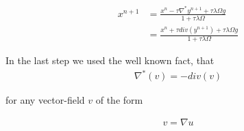 \begin{align}
	x^{n+1} 
	&= \frac{x^n - \tau \nabla^* y^{n+1} +  \tau \lambda \Omega g}{1+\tau \lambda \Omega} \nonumber \\
	&= \frac{x^n + \tau div(y^{n+1}) +  \tau \lambda \Omega g}{1+\tau \lambda \Omega}
\label{eq:update_x_n_p_1}	
\end{align}

In the last step we used the well known fact, that 
\begin{align}
	\nabla^* (v) = -div(v)
\end{align}

for any vector-field $v$ of the form 

\begin{align}
	v = \nabla u
\end{align}
 
